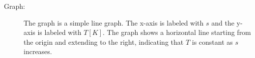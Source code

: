 

\item[a)] 
    \begin{description}
        \item[Graph:] The graph is a simple line graph. The x-axis is labeled with \( s \) and the y-axis is labeled with \( T [K] \). The graph shows a horizontal line starting from the origin and extending to the right, indicating that \( T \) is constant as \( s \) increases.
    \end{description}